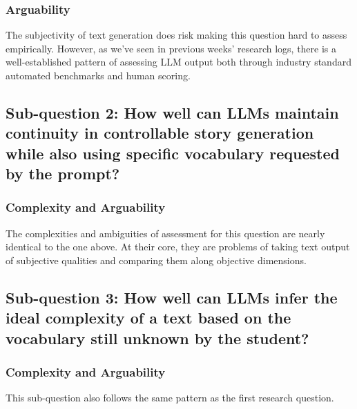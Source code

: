 \documentclass[
	letterpaper, %
]{jdf}
\begin{document}
\subsubsection{Arguability}
The subjectivity of text generation does risk making this question hard to assess empirically. However, as we've seen in previous weeks' research logs, there is a well-established pattern of assessing LLM output both through industry standard automated benchmarks and human scoring.

\subsection{Sub-question 2: How well can LLMs maintain continuity in controllable story generation while also using specific vocabulary requested by the prompt?}
\subsubsection{Complexity and Arguability}
The complexities and ambiguities of assessment for this question are nearly identical to the one above. At their core, they are problems of taking text output of subjective qualities and comparing them along objective dimensions.

\subsection{Sub-question 3: How well can LLMs infer the ideal complexity of a text based on the vocabulary still unknown by the student?}
\subsubsection{Complexity and Arguability}
This sub-question also follows the same pattern as the first research question.



\end{document}
